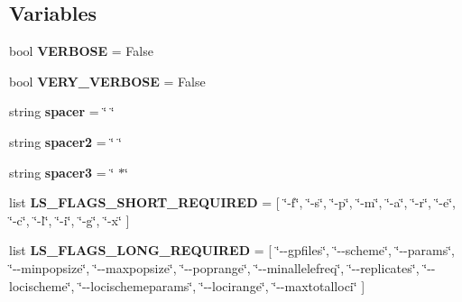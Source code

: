 \subsection*{Variables}
\begin{DoxyCompactItemize}
\item 
bool {\bfseries V\+E\+R\+B\+O\+SE} = False\hypertarget{namespacenegui_1_1pgdriveneestimator_aeae180a6a906ac89f58c9af1f6c8fd77}{}\label{namespacenegui_1_1pgdriveneestimator_aeae180a6a906ac89f58c9af1f6c8fd77}

\item 
bool {\bfseries V\+E\+R\+Y\+\_\+\+V\+E\+R\+B\+O\+SE} = False\hypertarget{namespacenegui_1_1pgdriveneestimator_ab3e4d5f9e16fe1e71748c637b908eb55}{}\label{namespacenegui_1_1pgdriveneestimator_ab3e4d5f9e16fe1e71748c637b908eb55}

\item 
string {\bfseries spacer} = \char`\"{} \char`\"{}\hypertarget{namespacenegui_1_1pgdriveneestimator_aafee69ac080e88e81d87a33561b3fcea}{}\label{namespacenegui_1_1pgdriveneestimator_aafee69ac080e88e81d87a33561b3fcea}

\item 
string {\bfseries spacer2} = \char`\"{} \char`\"{}\hypertarget{namespacenegui_1_1pgdriveneestimator_a9f80a81346d030624035928340fd4b9e}{}\label{namespacenegui_1_1pgdriveneestimator_a9f80a81346d030624035928340fd4b9e}

\item 
string {\bfseries spacer3} = \char`\"{} $\ast$\char`\"{}\hypertarget{namespacenegui_1_1pgdriveneestimator_a28b0742536e40623d9882bf0631f6217}{}\label{namespacenegui_1_1pgdriveneestimator_a28b0742536e40623d9882bf0631f6217}

\item 
list {\bfseries L\+S\+\_\+\+F\+L\+A\+G\+S\+\_\+\+S\+H\+O\+R\+T\+\_\+\+R\+E\+Q\+U\+I\+R\+ED} = \mbox{[} \char`\"{}-\/f\char`\"{}, \char`\"{}-\/s\char`\"{}, \char`\"{}-\/p\char`\"{}, \char`\"{}-\/m\char`\"{}, \char`\"{}-\/a\char`\"{}, \char`\"{}-\/r\char`\"{}, \char`\"{}-\/e\char`\"{}, \char`\"{}-\/c\char`\"{}, \char`\"{}-\/l\char`\"{}, \char`\"{}-\/i\char`\"{}, \char`\"{}-\/g\char`\"{}, \char`\"{}-\/x\char`\"{} \mbox{]}\hypertarget{namespacenegui_1_1pgdriveneestimator_a483e5730350478fd7a79e4a59c1381ef}{}\label{namespacenegui_1_1pgdriveneestimator_a483e5730350478fd7a79e4a59c1381ef}

\item 
list {\bfseries L\+S\+\_\+\+F\+L\+A\+G\+S\+\_\+\+L\+O\+N\+G\+\_\+\+R\+E\+Q\+U\+I\+R\+ED} = \mbox{[} \char`\"{}-\/-\/gpfiles\char`\"{}, \char`\"{}-\/-\/scheme\char`\"{}, \char`\"{}-\/-\/params\char`\"{}, \char`\"{}-\/-\/minpopsize\char`\"{}, \char`\"{}-\/-\/maxpopsize\char`\"{}, \char`\"{}-\/-\/poprange\char`\"{}, \char`\"{}-\/-\/minallelefreq\char`\"{}, \char`\"{}-\/-\/replicates\char`\"{}, \char`\"{}-\/-\/locischeme\char`\"{}, \char`\"{}-\/-\/locischemeparams\char`\"{}, \char`\"{}-\/-\/locirange\char`\"{}, \char`\"{}-\/-\/maxtotalloci\char`\"{} \mbox{]}\hypertarget{namespacenegui_1_1pgdriveneestimator_a8bbe97508573b995c1b4647b14b3bad5}{}\label{namespacenegui_1_1pgdriveneestimator_a8bbe97508573b995c1b4647b14b3bad5}


\end{DoxyCompactItemize}
